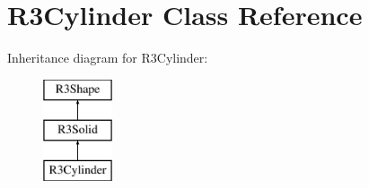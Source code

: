 \hypertarget{class_r3_cylinder}{}\section{R3\+Cylinder Class Reference}
\label{class_r3_cylinder}
Inheritance diagram for R3\+Cylinder\+:\begin{figure}[H]
\begin{center}
\leavevmode
\includegraphics[height=3.000000cm]{class_r3_cylinder}
\end{center}
\end{figure}
